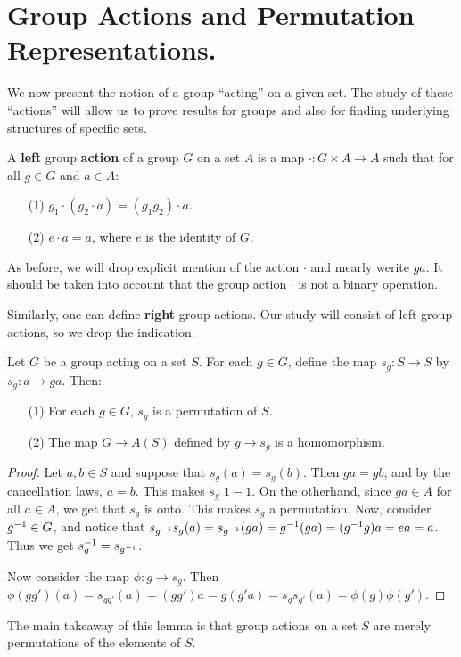 \section{Group Actions and Permutation Representations.}

We now present the notion of a group ``acting'' on a given set. The study of
these ``actions'' will allow us to prove results for groups and also for finding
underlying structures of specific sets.

\begin{definition}
    A \textbf{left} group \textbf{action} of a group $G$ on a set  $A$ is a map
    $\cdot: G \times A
    \rightarrow A$ such that for all $g \in G$ and  $a \in A$:
    \begin{enumerate}
        \item[(1)] $g_1 \cdot (g_2 \cdot a)=(g_1g_2) \cdot a$.

        \item[(2)] $e \cdot a=a$, where  $e$ is the identity of  $G$.
    \end{enumerate}
\end{definition}
\begin{remark}
    As before, we will drop explicit mention of the action $\cdot$ and mearly
    werite $ga$. It should be taken into account that the group action $\cdot$
    is not a binary operation.
\end{remark}
\begin{remark}
    Similarly, one can define \textbf{right} group actions. Our study will
    consist of left group actions, so we drop the indication.
\end{remark}

\begin{lemma}\label{4.1.1}
    Let $G$ be a group acting on a set $S$. For each $g \in G$, define the map
    $s_g:S \rightarrow S$ by $s_g:a \rightarrow ga$. Then:
    \begin{enumerate}
        \item[(1)] For each $g \in G$,  $s_g$ is a permutation of  $S$.

        \item [(2)] The map $G \rightarrow A(S)$ defined by $g \rightarrow
            s_g$ is a homomorphism.
    \end{enumerate}
\end{lemma}
\begin{proof}
    Let $a,b \in S$ and suppose that $s_g(a)=s_g(b)$. Then $ga=gb$,
    and by the cancellation laws,  $a=b$. This makes $s_g$  $1-1$. On the
    otherhand, since $ga \in A$ for all $a \in A$, we get that $s_g$ is
    onto. This makes  $s_g$ a permutation. Now, consider  $g^{-1} \in G$,
    and notice that
    $s_{g^{-1}}s_g(a)=s_{g^{-1}}(ga)=g^{-1}(ga)=(g^{-1}g)a=ea=a$.
    Thus we get $s_g^{-1}=s_{g^{-1}}$.

    Now consider the map $\phi:g \rightarrow s_g$. Then
    $\phi(gg')(a)=s_{gg'}(a)=(gg')a=g(g'a)=s_gs_{g'}(a)= \phi(g)\phi(g')$.
\end{proof}
\begin{remark}
    The main takeaway of this lemma is that group actions on a set $S$ are
    merely permutations of the elements of  $S$.
\end{remark}

